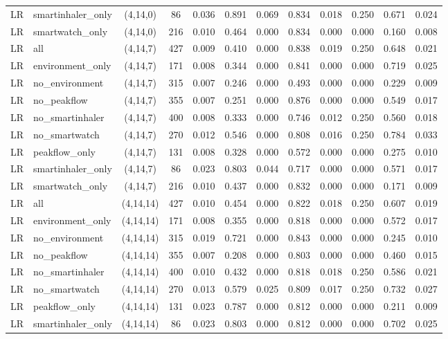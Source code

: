 \begin{longtable}{llcccccccccc}
LR & smartinhaler\_only & (4,14,0) & 86 & 0.036 & 0.891 & 0.069 & 0.834 & 0.018 & 0.250 & 0.671 & 0.024 \\
LR & smartwatch\_only & (4,14,0) & 216 & 0.010 & 0.464 & 0.000 & 0.834 & 0.000 & 0.000 & 0.160 & 0.008 \\
LR & all & (4,14,7) & 427 & 0.009 & 0.410 & 0.000 & 0.838 & 0.019 & 0.250 & 0.648 & 0.021 \\
LR & environment\_only & (4,14,7) & 171 & 0.008 & 0.344 & 0.000 & 0.841 & 0.000 & 0.000 & 0.719 & 0.025 \\
LR & no\_environment & (4,14,7) & 315 & 0.007 & 0.246 & 0.000 & 0.493 & 0.000 & 0.000 & 0.229 & 0.009 \\
LR & no\_peakflow & (4,14,7) & 355 & 0.007 & 0.251 & 0.000 & 0.876 & 0.000 & 0.000 & 0.549 & 0.017 \\
LR & no\_smartinhaler & (4,14,7) & 400 & 0.008 & 0.333 & 0.000 & 0.746 & 0.012 & 0.250 & 0.560 & 0.018 \\
LR & no\_smartwatch & (4,14,7) & 270 & 0.012 & 0.546 & 0.000 & 0.808 & 0.016 & 0.250 & 0.784 & 0.033 \\
LR & peakflow\_only & (4,14,7) & 131 & 0.008 & 0.328 & 0.000 & 0.572 & 0.000 & 0.000 & 0.275 & 0.010 \\
LR & smartinhaler\_only & (4,14,7) & 86 & 0.023 & 0.803 & 0.044 & 0.717 & 0.000 & 0.000 & 0.571 & 0.017 \\
LR & smartwatch\_only & (4,14,7) & 216 & 0.010 & 0.437 & 0.000 & 0.832 & 0.000 & 0.000 & 0.171 & 0.009 \\
LR & all & (4,14,14) & 427 & 0.010 & 0.454 & 0.000 & 0.822 & 0.018 & 0.250 & 0.607 & 0.019 \\
LR & environment\_only & (4,14,14) & 171 & 0.008 & 0.355 & 0.000 & 0.818 & 0.000 & 0.000 & 0.572 & 0.017 \\
LR & no\_environment & (4,14,14) & 315 & 0.019 & 0.721 & 0.000 & 0.843 & 0.000 & 0.000 & 0.245 & 0.010 \\
LR & no\_peakflow & (4,14,14) & 355 & 0.007 & 0.208 & 0.000 & 0.803 & 0.000 & 0.000 & 0.460 & 0.015 \\
LR & no\_smartinhaler & (4,14,14) & 400 & 0.010 & 0.432 & 0.000 & 0.818 & 0.018 & 0.250 & 0.586 & 0.021 \\
LR & no\_smartwatch & (4,14,14) & 270 & 0.013 & 0.579 & 0.025 & 0.809 & 0.017 & 0.250 & 0.732 & 0.027 \\
LR & peakflow\_only & (4,14,14) & 131 & 0.023 & 0.787 & 0.000 & 0.812 & 0.000 & 0.000 & 0.211 & 0.009 \\
LR & smartinhaler\_only & (4,14,14) & 86 & 0.023 & 0.803 & 0.000 & 0.812 & 0.000 & 0.000 & 0.702 & 0.025 \\

\end{longtable}
